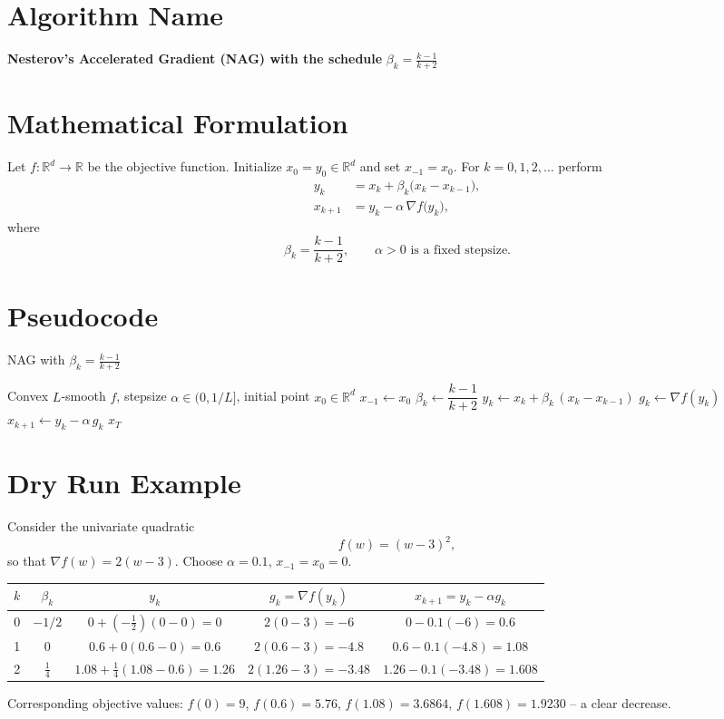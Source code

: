 \documentclass{article}
\newcommand{\R}{\mathbb{R}}
\begin{document}
\section*{Algorithm Name}
\textbf{Nesterov’s Accelerated Gradient (NAG) with the schedule }$\displaystyle \beta_k=\frac{k-1}{k+2}$

\section*{Mathematical Formulation}
Let $f:\R^d\to\R$ be the objective function.  
Initialize $x_{0}=y_{0}\in\R^{d}$ and set $x_{-1}=x_{0}$.  
For $k=0,1,2,\dots$ perform
\begin{align}
    y_k &= x_k + \beta_k\bigl(x_k-x_{k-1}\bigr), \tag{1}\\
    x_{k+1} &= y_k - \alpha \,\nabla f\!\bigl(y_k\bigr), \tag{2}
\end{align}
where 
\[
\beta_k=\frac{k-1}{k+2},\qquad \alpha>0 \text{ is a fixed stepsize.}
\]

\section*{Pseudocode}
\begin{algorithm}[H]
\caption{NAG with $\beta_k=\frac{k-1}{k+2}$}
\begin{algorithmic}[1]
\Require Convex $L$‑smooth $f$, stepsize $\alpha\in(0,1/L]$, initial point $x_0\in\R^d$
\State $x_{-1}\gets x_0$
    \State $\beta_k \gets \dfrac{k-1}{k+2}$ 
    \State $y_k \gets x_k + \beta_k\,(x_k-x_{k-1})$ 
    \State $g_k \gets \nabla f(y_k)$
    \State $x_{k+1} \gets y_k - \alpha\, g_k$ 
\EndFor
\State \Return $x_T$
\end{algorithmic}
\end{algorithm}

\section*{Dry Run Example}
Consider the univariate quadratic 
\[
f(w)=(w-3)^2,
\]
so that $\nabla f(w)=2(w-3)$.  
Choose $\alpha=0.1$, $x_{-1}=x_0=0$.

\begin{center}
\begin{tabular}{c|c|c|c|c}
$k$ & $\beta_k$ & $y_k$ & $g_k=\nabla f(y_k)$ & $x_{k+1}=y_k-\alpha g_k$ \\ \hline
0 & $-1/2$ & $0+(-\tfrac12)(0-0)=0$ & $2(0-3)=-6$ & $0-0.1(-6)=0.6$ \\[4pt]
1 & $0$   & $0.6+0(0.6-0)=0.6$ & $2(0.6-3)=-4.8$ & $0.6-0.1(-4.8)=1.08$ \\[4pt]
2 & $\tfrac{1}{4}$ & $1.08+\tfrac14(1.08-0.6)=1.26$ & $2(1.26-3)=-3.48$ & $1.26-0.1(-3.48)=1.608$ 
\end{tabular}
\end{center}
Corresponding objective values: $f(0)=9$, $f(0.6)=5.76$, $f(1.08)=3.6864$, $f(1.608)=1.9230$ – a clear decrease.
\end{document}
